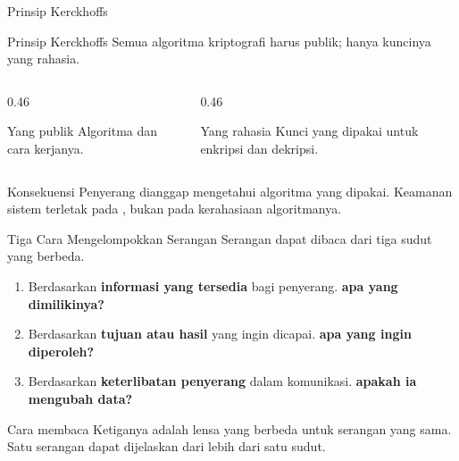 \documentclass[aspectratio=169,11pt]{beamer}
\begin{document}
\begin{frame}{Prinsip Kerckhoffs}
    \begin{alertblock}{Prinsip Kerckhoffs}
        Semua algoritma kriptografi harus publik; hanya kuncinya yang rahasia.
    \end{alertblock}
    \vspace{0.3cm}
    \begin{columns}[T,onlytextwidth]
        \begin{column}{0.46\textwidth}
            \begin{block}{Yang publik}
                Algoritma dan cara kerjanya.
            \end{block}
        \end{column}
        \begin{column}{0.46\textwidth}
            \begin{block}{Yang rahasia}
                Kunci yang dipakai untuk enkripsi dan dekripsi.
            \end{block}
        \end{column}
    \end{columns}
    \vspace{0.3cm}
    \begin{exampleblock}{Konsekuensi}
        Penyerang dianggap mengetahui algoritma yang dipakai. Keamanan sistem
        terletak pada , bukan pada kerahasiaan algoritmanya.
    \end{exampleblock}
\end{frame}

\begin{frame}{Tiga Cara Mengelompokkan Serangan}
    Serangan dapat dibaca dari tiga sudut yang berbeda.
    \vspace{0.35cm}
    \begin{enumerate}
        \item Berdasarkan \textbf{informasi yang tersedia} bagi penyerang.
              \hfill\textcolor{ubbblue}{\textbf{apa yang dimilikinya?}}
        \item Berdasarkan \textbf{tujuan atau hasil} yang ingin dicapai.
              \hfill\textcolor{ubbblue}{\textbf{apa yang ingin diperoleh?}}
        \item Berdasarkan \textbf{keterlibatan penyerang} dalam komunikasi.
              \hfill\textcolor{ubbblue}{\textbf{apakah ia mengubah data?}}
    \end{enumerate}
    \vspace{0.35cm}
    \begin{exampleblock}{Cara membaca}
        Ketiganya adalah lensa yang berbeda untuk serangan yang sama. Satu
        serangan dapat dijelaskan dari lebih dari satu sudut.
    \end{exampleblock}
\end{frame}
\end{document}

